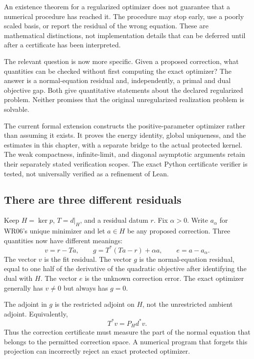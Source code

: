 \label{sec:inexact-repair}
An existence theorem for a regularized optimizer does not guarantee that a numerical procedure has reached it. The procedure may stop early, use a poorly scaled basis, or report the residual of the wrong equation. These are mathematical distinctions, not implementation details that can be deferred until after a certificate has been interpreted.

The relevant question is now more specific. Given a proposed correction, what quantities can be checked without first computing the exact optimizer? The answer is a normal-equation residual and, independently, a primal and dual objective gap. Both give quantitative statements about the declared regularized problem. Neither promises that the original unregularized realization problem is solvable.

\begin{scopebox}
The current formal extension constructs the positive-parameter optimizer rather than assuming it exists. It proves the energy identity, global uniqueness, and the estimates in this chapter, with a separate bridge to the actual protected kernel. The weak compactness, infinite-limit, and diagonal asymptotic arguments retain their separately stated verification scopes. The exact Python certificate verifier is tested, not universally verified as a refinement of Lean.
\end{scopebox}

\subsection{There are three different residuals}
Keep $H=\ker p$, $T=d|_H$, and a residual datum $r$. Fix $\alpha>0$. Write $a_\alpha$ for WR06's unique minimizer and let $a\in H$ be any proposed correction. Three quantities now have different meanings:
\[
 v=r-Ta,\qquad
 g=T^*(Ta-r)+\alpha a,\qquad
 e=a-a_\alpha.
\]
The vector $v$ is the fit residual. The vector $g$ is the normal-equation residual, equal to one half of the derivative of the quadratic objective after identifying the dual with $H$. The vector $e$ is the unknown correction error. The exact optimizer generally has $v\ne0$ but always has $g=0$.

The adjoint in $g$ is the restricted adjoint on $H$, not the unrestricted ambient adjoint. Equivalently,
\[
 T^*v=P_Hd^*v.
\]
Thus the correction certificate must measure the part of the normal equation that belongs to the permitted correction space. A numerical program that forgets this projection can incorrectly reject an exact protected optimizer.

